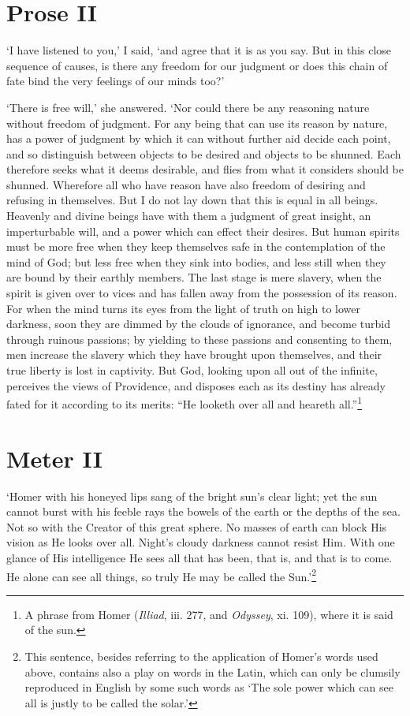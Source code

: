 \section*{Prose II}

`I have listened to you,' I said, `and agree that it is as you say.
But in this close sequence of causes, is there any freedom for our
judgment or does this chain of fate bind the very feelings of our
minds too?'

`There is free will,' she answered. `Nor could there be any reasoning
nature without freedom of judgment. For any being that can use its
reason by nature, has a power of judgment by which it can without
further aid decide each point, and so distinguish between objects to
be desired and objects to be shunned. Each therefore seeks what it
deems desirable, and flies from what it considers should be shunned.
Wherefore all who have reason have also freedom of desiring and
refusing in themselves. But I do not lay down that this is equal in
all beings. Heavenly and divine beings have with them a judgment of
great insight, an imperturbable will, and a power which can effect
their desires. But human  spirits must be more free when
they keep themselves safe in the contemplation of the mind of God; but
less free when they sink into bodies, and less still when they are
bound by their earthly members. The last stage is mere slavery, when
the spirit is given over to vices and has fallen away from the
possession of its reason. For when the mind turns its eyes from the
light of truth on high to lower darkness, soon they are dimmed by the
clouds of ignorance, and become turbid through ruinous passions; by
yielding to these passions and consenting to them, men increase the
slavery which they have brought upon themselves, and their true
liberty is lost in captivity. But God, looking upon all out of the
infinite, perceives the views of Providence, and disposes each as its
destiny has already fated for it according to its merits: ``He looketh
over all and heareth all.''\footnote{A phrase from Homer
(\textit{Illiad}, iii. 277, and \textit{Odyssey}, xi. 109), where it
is said of the sun.}

\section*{Meter II}

`Homer with his honeyed lips sang of the bright sun's clear light; yet
the sun cannot burst with his feeble rays the bowels of the earth or
the depths of the sea. Not so with the Creator of this great sphere.
No masses of earth can block His vision as He looks over all. Night's
cloudy darkness cannot resist Him. With one glance of His intelligence
He sees all that has been, that is, and that is to come.  He
alone can see all things, so truly He may be called the
Sun.'\footnote{This sentence, besides referring to the application of
Homer's words used above, contains also a play on words in the Latin,
which can only be clumsily reproduced in English by some such words as
`The sole power which can see all is justly to be called the
solar.'}


